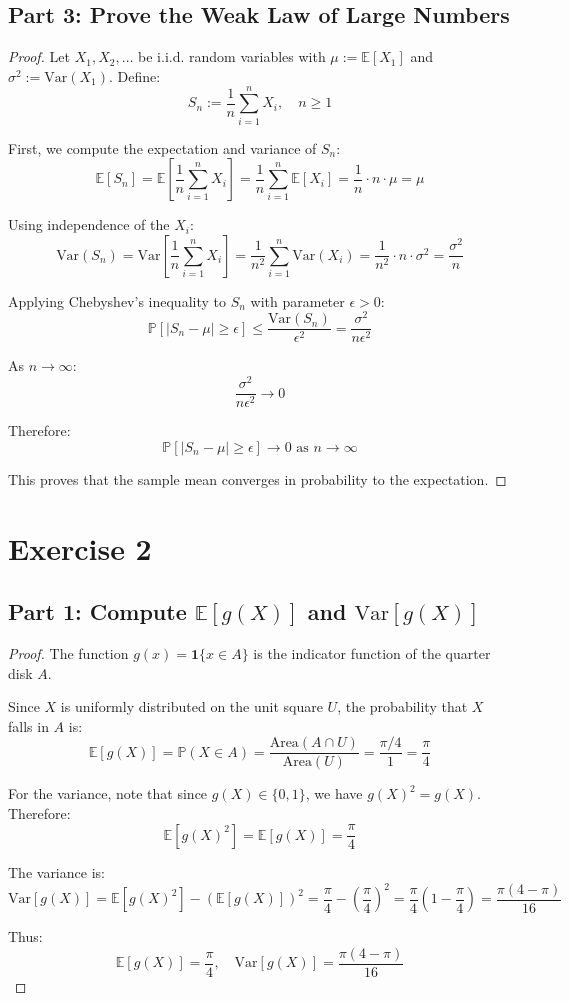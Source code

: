 \documentclass[12pt]{article}
\begin{document}
\subsection*{Part 3: Prove the Weak Law of Large Numbers}

\begin{proof}
Let $X_1, X_2, \ldots$ be i.i.d. random variables with $\mu := \mathbb{E}[X_1]$ and $\sigma^2 := \text{Var}(X_1)$. Define:
\[
S_n := \frac{1}{n}\sum_{i=1}^n X_i, \quad n \geq 1
\]

First, we compute the expectation and variance of $S_n$:
\[
\mathbb{E}[S_n] = \mathbb{E}\left[\frac{1}{n}\sum_{i=1}^n X_i\right] = \frac{1}{n}\sum_{i=1}^n \mathbb{E}[X_i] = \frac{1}{n} \cdot n \cdot \mu = \mu
\]

Using independence of the $X_i$:
\[
\text{Var}(S_n) = \text{Var}\left[\frac{1}{n}\sum_{i=1}^n X_i\right] = \frac{1}{n^2}\sum_{i=1}^n \text{Var}(X_i) = \frac{1}{n^2} \cdot n \cdot \sigma^2 = \frac{\sigma^2}{n}
\]

Applying Chebyshev's inequality to $S_n$ with parameter $\epsilon > 0$:
\[
\mathbb{P}[|S_n - \mu| \geq \epsilon] \leq \frac{\text{Var}(S_n)}{\epsilon^2} = \frac{\sigma^2}{n\epsilon^2}
\]

As $n \to \infty$:
\[
\frac{\sigma^2}{n\epsilon^2} \to 0
\]

Therefore:
\[
\boxed{\mathbb{P}[|S_n - \mu| \geq \epsilon] \to 0 \text{ as } n \to \infty}
\]

This proves that the sample mean converges in probability to the expectation.
\end{proof}

\section*{Exercise 2}

\subsection*{Part 1: Compute $\mathbb{E}[g(X)]$ and $\text{Var}[g(X)]$}

\begin{proof}
The function $g(x) = \mathbf{1}\{x \in A\}$ is the indicator function of the quarter disk $A$.

Since $X$ is uniformly distributed on the unit square $U$, the probability that $X$ falls in $A$ is:
\[
\mathbb{E}[g(X)] = \mathbb{P}(X \in A) = \frac{\text{Area}(A \cap U)}{\text{Area}(U)} = \frac{\pi/4}{1} = \frac{\pi}{4}
\]

For the variance, note that since $g(X) \in \{0, 1\}$, we have $g(X)^2 = g(X)$. Therefore:
\[
\mathbb{E}[g(X)^2] = \mathbb{E}[g(X)] = \frac{\pi}{4}
\]

The variance is:
\[
\text{Var}[g(X)] = \mathbb{E}[g(X)^2] - (\mathbb{E}[g(X)])^2 = \frac{\pi}{4} - \left(\frac{\pi}{4}\right)^2 = \frac{\pi}{4}\left(1 - \frac{\pi}{4}\right) = \frac{\pi(4-\pi)}{16}
\]

Thus:
\[
\boxed{\mathbb{E}[g(X)] = \frac{\pi}{4}, \quad \text{Var}[g(X)] = \frac{\pi(4-\pi)}{16}}
\]
\end{proof}
\end{document}
